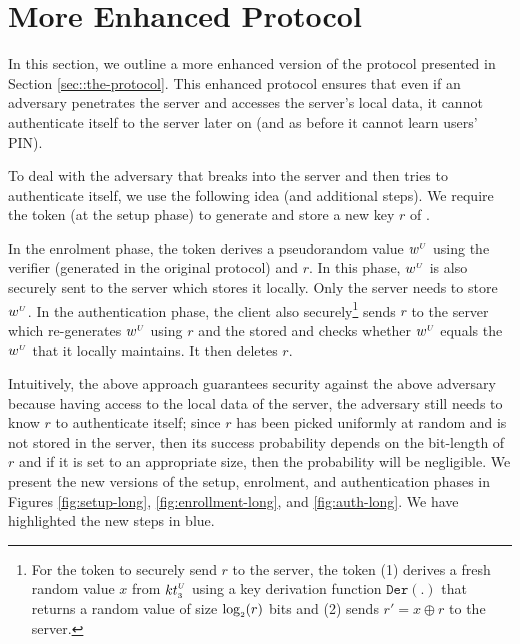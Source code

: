 

\section{More Enhanced Protocol}\label{sec::more-enhanced}



In this section, we outline a more enhanced version of the protocol presented in Section \ref{sec::the-protocol}. This enhanced protocol ensures that even if an adversary penetrates the server and accesses the server's local data, it cannot authenticate itself to the server later on (and as before it cannot learn users' PIN). 

To deal with the adversary that breaks into the server and then tries to authenticate itself, we use the following idea (and additional steps). We require the token (at the setup phase) to generate and store a new key $r$ of \prf.  

In the enrolment phase, the token derives a pseudorandom value $w^{\scriptscriptstyle U}$ using the verifier \VC{\verifier} (generated in the original protocol) and $r$. In this phase, $w^{\scriptscriptstyle U}$ is also securely sent to the server which stores it locally. Only the server needs to store $w^{\scriptscriptstyle U}$. 
%
In the authentication phase, the client also securely\footnote{For the token to securely send $r$ to the server, the token (1) derives a fresh random value $x$ from ${kt}_{\scriptscriptstyle 3}^{\scriptscriptstyle U}$ using a key derivation function $\mathtt{Der}(.)$ that returns a random value of size $\log_{\scriptscriptstyle 2}(r)$ bits and  (2) sends $r'=x\oplus r$ to the server.} sends $r$ to the server which re-generates  $w^{\scriptscriptstyle U}$ using $r$ and the stored \VC{\verifier} and checks whether $w^{\scriptscriptstyle U}$ equals the $w^{\scriptscriptstyle U}$ that it locally maintains. It then deletes $r$. 

Intuitively, the above approach guarantees security against the above adversary because having access to the local data of the server, the adversary still needs to know $r$ to authenticate itself; since $r$ has been picked uniformly at random and is not stored in the server, then its success probability depends on the bit-length of $r$ and if it is set to an appropriate size, then the probability will be negligible. 
%
%
We present the new versions of the setup, enrolment, and authentication phases in Figures \ref{fig:setup-long}, \ref{fig:enrollment-long}, and \ref{fig:auth-long}. We have highlighted the new steps in blue. 








